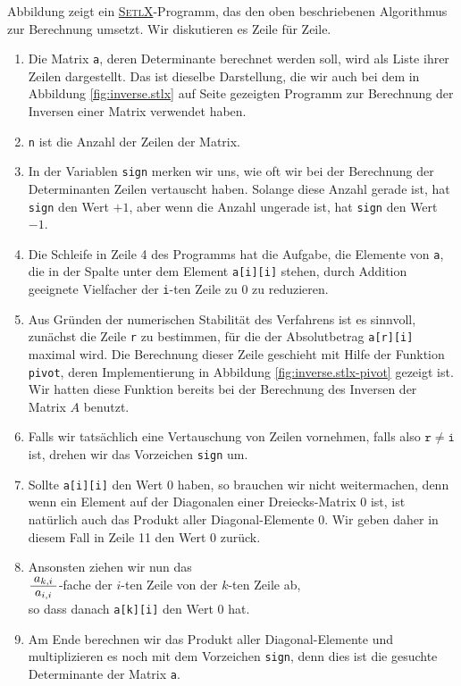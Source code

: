 Abbildung zeigt ein \href{http://randoom.org/Software/SetlX}{\textsc{SetlX}}-Programm, das den oben
beschriebenen Algorithmus zur Berechnung umsetzt.  Wir diskutieren es Zeile f\"ur Zeile.
\begin{enumerate}
\item Die Matrix \texttt{a}, deren Determinante berechnet werden soll, wird als Liste ihrer Zeilen
      dargestellt.  Das ist dieselbe Darstellung, die wir auch bei dem in Abbildung
      \ref{fig:inverse.stlx} auf Seite \pageref{fig:inverse.stlx} gezeigten Programm zur Berechnung
      der Inversen einer Matrix verwendet haben.
\item \texttt{n} ist die Anzahl der Zeilen der Matrix.
\item In der Variablen \texttt{sign} merken wir uns, wie oft wir bei der Berechnung der
      Determinanten Zeilen vertauscht haben.  Solange diese Anzahl gerade ist, hat \texttt{sign} den
      Wert $+1$, aber wenn die Anzahl ungerade ist, hat \texttt{sign} den Wert $-1$.
\item Die Schleife in Zeile 4 des Programms hat die Aufgabe, die Elemente von \texttt{a}, die in der Spalte
      unter dem Element \texttt{a[i][i]} stehen, durch Addition geeignete Vielfacher der
      \texttt{i}-ten Zeile zu $0$ zu reduzieren.
\item Aus Gr\"unden der numerischen Stabilit\"at des Verfahrens ist es sinnvoll, zun\"achst die Zeile
      \texttt{r} zu bestimmen, f\"ur die der Absolutbetrag \texttt{a[r][i]} maximal wird.  Die
      Berechnung dieser Zeile geschieht mit Hilfe der Funktion \texttt{pivot}, deren Implementierung
      in Abbildung \ref{fig:inverse.stlx-pivot} gezeigt ist.  Wir hatten diese Funktion bereits bei
      der Berechnung des Inversen der Matrix $A$ benutzt.
\item Falls wir tats\"achlich eine Vertauschung von Zeilen vornehmen, falls also $\mathtt{r} \not= \mathtt{i}$ ist,
      drehen wir das Vorzeichen \texttt{sign} um.
\item Sollte \texttt{a[i][i]} den Wert $0$ haben, so brauchen wir nicht weitermachen, denn wenn ein
      Element auf der Diagonalen einer Dreiecks-Matrix $0$ ist, ist nat\"urlich auch das Produkt aller
      Diagonal-Elemente $0$.  Wir geben daher in diesem Fall in Zeile 11 den Wert $0$ zur\"uck.
\item Ansonsten ziehen wir nun das 
      \\[0.2cm]
      \hspace*{1.3cm}
      $\bruch{a_{k,i}}{a_{i,i}}$-fache der $i$-ten Zeile von der $k$-ten Zeile ab,
      \\[0.2cm]
      so dass danach \texttt{a[k][i]} den Wert $0$ hat.
\item Am Ende berechnen wir das Produkt aller Diagonal-Elemente und multiplizieren es noch mit dem
      Vorzeichen \texttt{sign}, denn dies ist die gesuchte Determinante der Matrix \texttt{a}.
      \eoxs
\end{enumerate}

